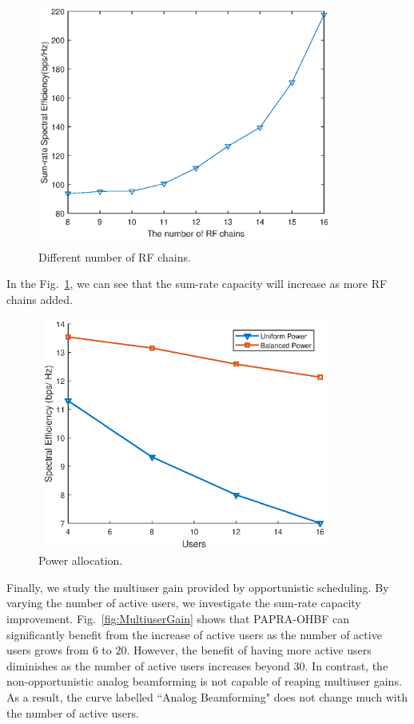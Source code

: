 \documentclass[conference]{IEEEtran}
\begin{document}
\begin{figure}[ht]
	\begin{center}
		\includegraphics[width=3.8in,height=3.2in]{Figure/NRFChains.eps}
		\caption{Different number of RF chains.}\label{fig:RFchains}
	\end{center}
\end{figure}
In the Fig.~\ref{fig:RFchains}, we can see that the sum-rate capacity will increase as more RF chains added.


\begin{figure}[ht]
	\begin{center}
		\includegraphics[width=3.8in,height=3in]{Figure/powerBalanced.eps}
		\caption{Power allocation.}\label{fig:CDF}
	\end{center}
\end{figure}


Finally, we study the multiuser gain provided by opportunistic scheduling. By varying the number of active users, we investigate the sum-rate capacity improvement. Fig.~\ref{fig:MultiuserGain} shows that PAPRA-OHBF can significantly benefit from the increase of active users as the number of active users grows from $6$ to $20$. However, the benefit of having more active users diminishes as the number of active users increases beyond $30$. In contrast, the non-opportunistic analog beamforming is not capable of reaping multiuser gains. As a result, the curve labelled ``Analog Beamforming" does not change much with the number of active users.	





\end{document}

